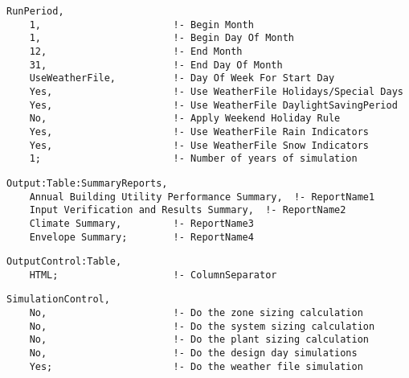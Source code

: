 \begin{lstlisting}
RunPeriod,
    1,                       !- Begin Month
    1,                       !- Begin Day Of Month
    12,                      !- End Month
    31,                      !- End Day Of Month
    UseWeatherFile,          !- Day Of Week For Start Day
    Yes,                     !- Use WeatherFile Holidays/Special Days
    Yes,                     !- Use WeatherFile DaylightSavingPeriod
    No,                      !- Apply Weekend Holiday Rule
    Yes,                     !- Use WeatherFile Rain Indicators
    Yes,                     !- Use WeatherFile Snow Indicators
    1;                       !- Number of years of simulation
\end{lstlisting}

\begin{lstlisting}
Output:Table:SummaryReports,
    Annual Building Utility Performance Summary,  !- ReportName1
    Input Verification and Results Summary,  !- ReportName2
    Climate Summary,         !- ReportName3
    Envelope Summary;        !- ReportName4
\end{lstlisting}

\begin{lstlisting}
OutputControl:Table,
    HTML;                    !- ColumnSeparator
\end{lstlisting}

\begin{lstlisting}
SimulationControl,
    No,                      !- Do the zone sizing calculation
    No,                      !- Do the system sizing calculation
    No,                      !- Do the plant sizing calculation
    No,                      !- Do the design day simulations
    Yes;                     !- Do the weather file simulation
\end{lstlisting}
